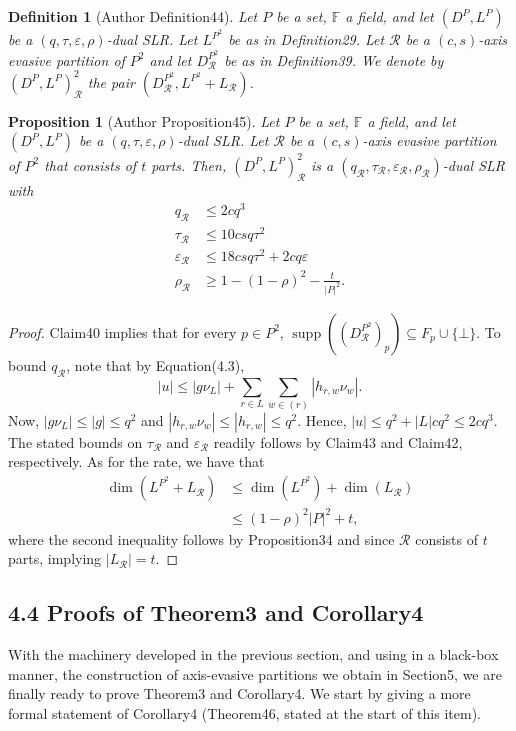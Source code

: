 \documentclass[10pt,a4paper]{article}
\newtheorem{ntdefinition}[nttheorem]{Definition}
\newtheorem{ntproposition}[nttheorem]{Proposition}
\begin{document}
\begin{ntdefinition}[Author Definition44]
Let $P$ be a set, $\mathbb F$ a field, and let $(D^P,L^P)$ be a $(q,\tau,\varepsilon,\rho)$-dual SLR. Let $L^{P^2}$ be as in Definition29. Let $\mathcal R$ be a $(c,s)$-axis evasive partition of $P^2$ and let $D_{\mathcal R}^{P^2}$ be as in Definition39. We denote by $(D^P,L^P)^2_{\mathcal R}$ the pair $(D_{\mathcal R}^{P^2},L^{P^2}+L_{\mathcal R})$.
\end{ntdefinition}
\begin{ntproposition}[Author Proposition45]
Let $P$ be a set, $\mathbb F$ a field, and let $(D^P,L^P)$ be a $(q,\tau,\varepsilon,\rho)$-dual SLR. Let $\mathcal R$ be a $(c,s)$-axis evasive partition of $P^2$ that consists of $t$ parts. Then, $(D^P,L^P)^2_{\mathcal R}$ is a $(q_{\mathcal R},\tau_{\mathcal R},\varepsilon_{\mathcal R},\rho_{\mathcal R})$-dual SLR with
\begin{align*}q_{\mathcal R}&\leq2cq^3\\\tau_{\mathcal R}&\leq10csq\tau^2\\\varepsilon_{\mathcal R}&\leq18csq\tau^2+2cq\varepsilon\\\rho_{\mathcal R}&\geq1-(1-\rho)^2-\frac t{|P|^2}.\end{align*}
\end{ntproposition}
\begin{proof}
Claim40 implies that for every $p\in P^2$, $\operatorname{supp}((D_{\mathcal R}^{P^2})_p)\subseteq F_p\cup\{\bot\}$. To bound $q_{\mathcal R}$, note that by Equation(4.3),
\[|u|\leq|g\nu_L|+\sum_{r\in L}\sum_{w\in(r)}|h_{r,w}\nu_w|.\]
Now, $|g\nu_L|\leq|g|\leq q^2$ and $|h_{r,w}\nu_w|\leq|h_{r,w}|\leq q^2$. Hence, $|u|\leq q^2+|L|cq^2\leq2cq^3$. The stated bounds on $\tau_{\mathcal R}$ and $\varepsilon_{\mathcal R}$ readily follows by Claim43 and Claim42, respectively. As for the rate, we have that
\begin{align*}\dim(L^{P^2}+L_{\mathcal R})&\leq\dim(L^{P^2})+\dim(L_{\mathcal R})\\&\leq(1-\rho)^2|P|^2+t,\end{align*}
where the second inequality follows by Proposition34 and since $\mathcal R$ consists of $t$ parts, implying $|L_{\mathcal R}|=t$.
\end{proof}

\subsection*{4.4 Proofs of Theorem3 and Corollary4}
With the machinery developed in the previous section, and using in a black-box manner, the construction of axis-evasive partitions we obtain in Section5, we are finally ready to prove Theorem3 and Corollary4. We start by giving a more formal statement of Corollary4 (Theorem46, stated at the start of this item).
\end{document}
